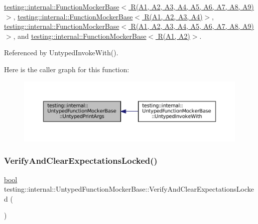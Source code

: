 \hyperlink{classtesting_1_1internal_1_1FunctionMockerBase_a6f77ce4fad16e1c8508fe6da71e8b930}{testing\+::internal\+::\+Function\+Mocker\+Base$<$ R(\+A1, A2, A3, A4, A5, A6, A7, A8, A9)$>$}, \hyperlink{classtesting_1_1internal_1_1FunctionMockerBase_a6f77ce4fad16e1c8508fe6da71e8b930}{testing\+::internal\+::\+Function\+Mocker\+Base$<$ R(\+A1, A2, A3, A4)$>$}, \hyperlink{classtesting_1_1internal_1_1FunctionMockerBase_a6f77ce4fad16e1c8508fe6da71e8b930}{testing\+::internal\+::\+Function\+Mocker\+Base$<$ R(\+A1, A2, A3, A4, A5, A6, A7, A8, A9) $>$}, and \hyperlink{classtesting_1_1internal_1_1FunctionMockerBase_a6f77ce4fad16e1c8508fe6da71e8b930}{testing\+::internal\+::\+Function\+Mocker\+Base$<$ R(\+A1, A2)$>$}.



Referenced by Untyped\+Invoke\+With().

Here is the caller graph for this function\+:
\nopagebreak
\begin{figure}[H]
\begin{center}
\leavevmode
\includegraphics[width=350pt]{classtesting_1_1internal_1_1UntypedFunctionMockerBase_ae8c91f05fc90e66a84df49aae8de0d41_icgraph}
\end{center}
\end{figure}
\mbox{\label{classtesting_1_1internal_1_1UntypedFunctionMockerBase_a3f1d62a1662a3daa2895b3af963be269}} 
\subsubsection{\texorpdfstring{Verify\+And\+Clear\+Expectations\+Locked()}{VerifyAndClearExpectationsLocked()}}
{\footnotesize\ttfamily \hyperlink{classbool}{bool} testing\+::internal\+::\+Untyped\+Function\+Mocker\+Base\+::\+Verify\+And\+Clear\+Expectations\+Locked (\begin{DoxyParamCaption}{ }\end{DoxyParamCaption})}



